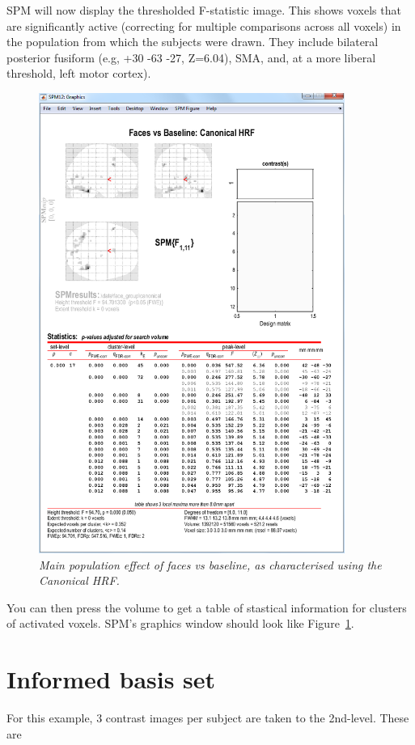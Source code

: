 \documentclass[a4paper,titlepage]{book}
\begin{document}
SPM will now display the thresholded F-statistic image. This shows voxels that are significantly active (correcting for multiple comparisons across all voxels) in the population from which the subjects were drawn. They include bilateral posterior fusiform (e.g, +30 -63 -27, Z=6.04), SMA, and, at a more liberal threshold, left motor cortex). 
\begin{figure}
\begin{center}
\includegraphics[width=100mm]{faces_group/f1_res}
\caption{\em Main population effect of faces vs baseline, as characterised using the Canonical HRF. \label{f1_res}}
\end{center}
\end{figure}
You can then press the volume to get a table of stastical information for clusters of activated voxels. SPM's graphics window should look like Figure~\ref{f1_res}.

\section{Informed basis set}

For this example, 3 contrast images per subject are taken to the 2nd-level. These are
\end{document}
